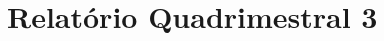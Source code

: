 \documentclass[a4paper,10pt,oneside,brazilian,
draft=false]{report}%
\begin{document}
\chapter{Relatório Quadrimestral 3}






\end{document}
